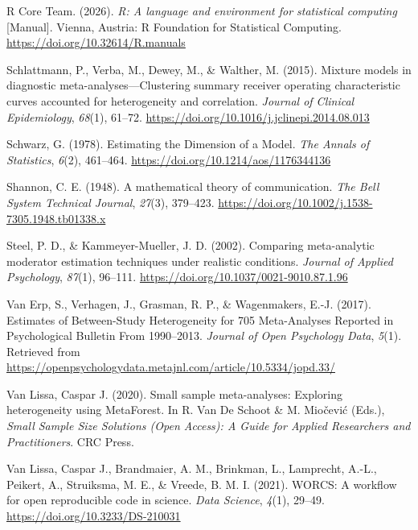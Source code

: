 \documentclass[
  english,
  man, noextraspace,floatsintext]{apa6}
\newlength{\cslhangindent}
\newenvironment{CSLReferences}[2] %
 {\begin{list}{}{%
  \setlength{\itemindent}{0pt}
  \setlength{\leftmargin}{0pt}
  \setlength{\parsep}{0pt}
  \ifodd #1
   \setlength{\leftmargin}{\cslhangindent}
   \setlength{\itemindent}{-1\cslhangindent}
  \fi
  \setlength{\itemsep}{#2\baselineskip}}}
 {\end{list}}
\begin{document}
\begin{CSLReferences}{1}{0}
R Core Team. (2026). \emph{R: A language and environment for statistical computing} {[}Manual{]}. Vienna, Austria: R Foundation for Statistical Computing. \url{https://doi.org/10.32614/R.manuals}

Schlattmann, P., Verba, M., Dewey, M., \& Walther, M. (2015). Mixture models in diagnostic meta-analyses---{Clustering} summary receiver operating characteristic curves accounted for heterogeneity and correlation. \emph{Journal of Clinical Epidemiology}, \emph{68}(1), 61--72. \url{https://doi.org/10.1016/j.jclinepi.2014.08.013}

Schwarz, G. (1978). Estimating the {Dimension} of a {Model}. \emph{The Annals of Statistics}, \emph{6}(2), 461--464. \url{https://doi.org/10.1214/aos/1176344136}

Shannon, C. E. (1948). A mathematical theory of communication. \emph{The Bell System Technical Journal}, \emph{27}(3), 379--423. \url{https://doi.org/10.1002/j.1538-7305.1948.tb01338.x}

Steel, P. D., \& Kammeyer-Mueller, J. D. (2002). Comparing meta-analytic moderator estimation techniques under realistic conditions. \emph{Journal of Applied Psychology}, \emph{87}(1), 96--111. \url{https://doi.org/10.1037/0021-9010.87.1.96}

Van Erp, S., Verhagen, J., Grasman, R. P., \& Wagenmakers, E.-J. (2017). Estimates of {Between-Study Heterogeneity} for 705 {Meta-Analyses Reported} in {Psychological Bulletin From} 1990--2013. \emph{Journal of Open Psychology Data}, \emph{5}(1). Retrieved from \url{https://openpsychologydata.metajnl.com/article/10.5334/jopd.33/}

Van Lissa, Caspar J. (2020). Small sample meta-analyses: {Exploring} heterogeneity using {MetaForest}. In R. Van De Schoot \& M. Miočević (Eds.), \emph{Small {Sample Size Solutions} ({Open Access}): {A Guide} for {Applied Researchers} and {Practitioners}}. CRC Press.

Van Lissa, Caspar J., Brandmaier, A. M., Brinkman, L., Lamprecht, A.-L., Peikert, A., Struiksma, M. E., \& Vreede, B. M. I. (2021). {WORCS}: {A} workflow for open reproducible code in science. \emph{Data Science}, \emph{4}(1), 29--49. \url{https://doi.org/10.3233/DS-210031}


\end{CSLReferences}
\end{document}

